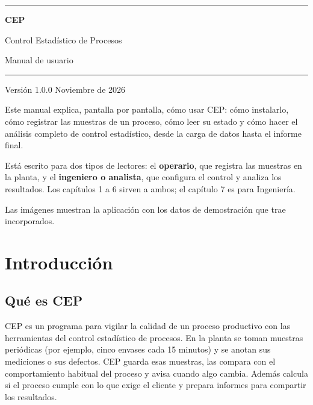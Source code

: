 \documentclass[11pt,a4paper]{article}
\begin{document}
\begin{titlepage}
\vspace*{2.5cm}
{\color{primario}\rule{\linewidth}{1.2pt}}\par\vspace{1.2em}
{\fontsize{30}{36}\selectfont\bfseries\color{primario} CEP\par}
\vspace{0.4em}
{\LARGE Control Estadístico de Procesos\par}
\vspace{1.5em}
{\Large Manual de usuario\par}
\vspace{1.2em}
{\color{primario}\rule{\linewidth}{1.2pt}}\par
\vspace{2em}
{\large Versión 1.0.0 \hfill Noviembre de 2026\par}
\vfill
\begin{minipage}{\linewidth}\color{gristexto}
Este manual explica, pantalla por pantalla, cómo usar CEP: cómo instalarlo, cómo registrar las
muestras de un proceso, cómo leer su estado y cómo hacer el análisis completo de control
estadístico, desde la carga de datos hasta el informe final.

\medskip
Está escrito para dos tipos de lectores: el \textbf{operario}, que registra las muestras en la
planta, y el \textbf{ingeniero o analista}, que configura el control y analiza los resultados. Los
capítulos 1 a 6 sirven a ambos; el capítulo 7 es para Ingeniería.

\medskip
Las imágenes muestran la aplicación con los datos de demostración que trae incorporados.
\end{minipage}
\end{titlepage}

{\setlength{\parskip}{0pt}\tableofcontents}
\newpage

\section{Introducción}

\subsection{Qué es CEP}
CEP es un programa para vigilar la calidad de un proceso productivo con las herramientas del
control estadístico de procesos. En la planta se toman muestras periódicas (por ejemplo, cinco
envases cada 15 minutos) y se anotan sus mediciones o sus defectos. CEP guarda esas muestras, las
compara con el comportamiento habitual del proceso y avisa cuando algo cambia. Además calcula si el
proceso cumple con lo que exige el cliente y prepara informes para compartir los resultados.
\end{document}
